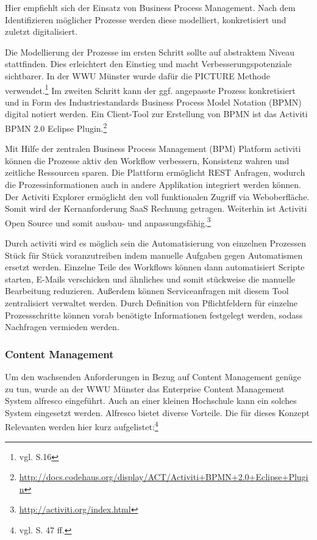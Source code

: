 Hier empfiehlt sich der Einsatz von Business Process Management. Nach dem Identifizieren möglicher Prozesse werden diese modelliert, konkretisiert und zuletzt digitalisiert.

Die Modellierung der Prozesse im ersten Schritt sollte auf abstraktem Niveau stattfinden. Dies erleichtert den Einstieg und macht Verbesserungspotenziale sichtbarer. In der WWU Münster wurde dafür die PICTURE Methode verwendet.\footnote{vgl. \cite{becker_prozesse_2010} S.16}
Im zweiten Schritt kann der ggf. angepasste Prozess konkretisiert und in Form des Industriestandards Business Process Model Notation (BPMN) digital notiert werden. Ein Client-Tool zur Erstellung von BPMN ist das Activiti BPMN 2.0 Eclipse Plugin.\footnote{\url{http://docs.codehaus.org/display/ACT/Activiti+BPMN+2.0+Eclipse+Plugin}}

Mit Hilfe der zentralen Business Process Management (BPM) Platform activiti können die Prozesse aktiv den Workflow verbessern, Konsistenz wahren und zeitliche Ressourcen sparen.  Die Plattform ermöglicht REST Anfragen, wodurch die Prozessinformationen auch in andere Applikation integriert werden können. Der Activiti Explorer ermöglicht den voll funktionalen Zugriff via Weboberfläche. Somit wird der Kernanforderung SaaS Rechnung getragen. Weiterhin ist Activiti Open Source und somit ausbau- und anpassungsfähig.\footnote{\url{http://activiti.org/index.html}}

Durch activiti wird es möglich sein die Automatisierung von einzelnen Prozessen Stück für Stück voranzutreiben indem manuelle Aufgaben gegen Automatismen ersetzt werden. Einzelne Teile des Workflows können dann automatisiert Scripte starten, E-Mails verschicken und ähnliches und somit stückweise die manuelle Bearbeitung reduzieren. Außerdem können Serviceanfragen mit diesem Tool zentralisiert verwaltet werden. Durch Definition von Pflichtfeldern für einzelne Prozessschritte können vorab benötigte Informationen festgelegt werden, sodass Nachfragen vermieden werden.

\subsubsection{Content Management}
Um den wachsenden Anforderungen in Bezug auf Content Management genüge zu tun, wurde an der WWU Münster das Enterprise Content Management System alfresco eingeführt. Auch an einer kleinen Hochschule kann ein solches System eingesetzt werden. Alfresco bietet diverse Vorteile. Die für dieses Konzept Relevanten werden hier kurz aufgelistet:\footnote{vgl. \cite{kloetgen_2012} S. 47 ff.}

